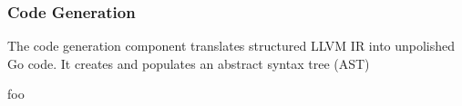 
\subsubsection{Code Generation}
\label{sec:design_code_generation}


The code generation component translates structured LLVM IR into unpolished Go code. It creates and populates an abstract syntax tree (AST)


foo
